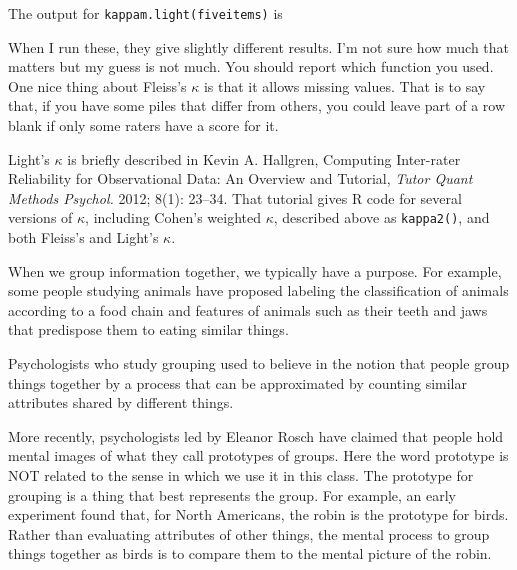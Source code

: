 The output for \texttt{kappam.light(fiveitems)} is

\begin{Shaded}
\begin{Highlighting}[]


\end{Highlighting}
\end{Shaded}

When I run these, they give slightly different results. I'm not sure how
much that matters but my guess is not much. You should report which
function you used. One nice thing about Fleiss's \(\kappa\) is that it
allows missing values. That is to say that, if you have some piles that
differ from others, you could leave part of a row blank if only some
raters have a score for it.

Light's \(\kappa\) is briefly described in Kevin A. Hallgren, Computing
Inter-rater Reliability for Observational Data: An Overview and
Tutorial, \emph{Tutor Quant Methods Psychol.} 2012; 8(1): 23--34. That
tutorial gives R code for several versions of \(\kappa\), including
Cohen's weighted \(\kappa\), described above as \texttt{kappa2()}, and
both Fleiss's and Light's \(\kappa\).

\hypertarget{grouping}{%
\label{grouping}}

When we group information together, we typically have a purpose. For
example, some people studying animals have proposed labeling the
classification of animals according to a food chain and features of
animals such as their teeth and jaws that predispose them to eating
similar things.

Psychologists who study grouping used to believe in the notion that
people group things together by a process that can be approximated by
counting similar attributes shared by different things.

More recently, psychologists led by Eleanor Rosch have claimed that
people hold mental images of what they call prototypes of groups. Here
the word prototype is NOT related to the sense in which we use it in
this class. The prototype for grouping is a thing that best represents
the group. For example, an early experiment found that, for North
Americans, the robin is the prototype for birds. Rather than evaluating
attributes of other things, the mental process to group things together
as birds is to compare them to the mental picture of the robin.

